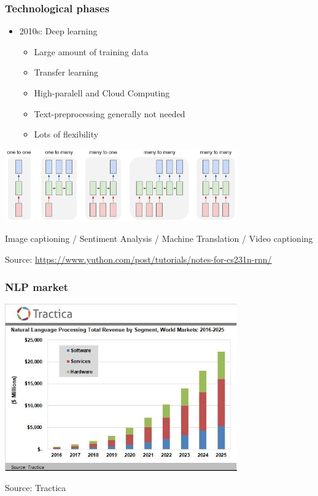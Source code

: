 \documentclass{beamer}
\begin{document}
\begin{frame}

	\frametitle{Technological phases}

\vspace{.3cm}
\begin{itemize}
    \item 2010s: Deep learning
        \begin{itemize}
            \item Large amount of training data
            \item Transfer learning
            \item High-paralell and Cloud Computing
            \item Text-preprocessing generally not needed
            \item Lots of flexibility
        \end{itemize}

\end{itemize}
\centerline{\includegraphics[width=10cm]{./figs/RNN_flexibility.png}}
\footnotesize
Image captioning / Sentiment Analysis / Machine Translation / Video captioning

\tiny
Source: \url{https://www.yuthon.com/post/tutorials/notes-for-cs231n-rnn/}
\end{frame}

\begin{frame}

\frametitle{NLP market}

\centerline{\includegraphics[width=10cm]{./figs/NLP_market.jpg}}

\tiny
Source: Tractica
\end{frame}
\end{document}
